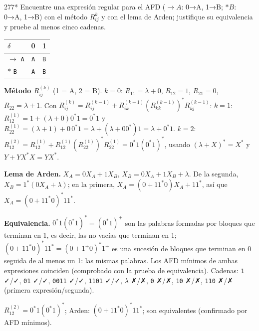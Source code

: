 \documentclass[11pt]{article}
\begin{document}
\begin{ejercicio}{277}{*}
Encuentre una expresión regular para el AFD ($\to A$: 0→A, 1→B; $*B$: 0→A, 1→B) con el método $R_{ij}^{k}$ y con el lema de Arden; justifique su equivalencia y pruebe al menos cinco cadenas.
\end{ejercicio}
\proc \begin{center}\small\begin{tabular}{lcc}\toprule
$\delta$ & 0 & 1 \\\midrule
$\to$ \texttt{A} & \texttt{A} & \texttt{B} \\
$*$ \texttt{B} & \texttt{A} & \texttt{B} \\
\bottomrule\end{tabular}\end{center}
\textbf{Método $R_{ij}^{(k)}$} (1 = A, 2 = B). $k = 0$: $R_{11} = \lambda + 0$, $R_{12} = 1$, $R_{21} = 0$, $R_{22} = \lambda + 1$. Con $R_{ij}^{(k)} = R_{ij}^{(k-1)} + R_{ik}^{(k-1)}(R_{kk}^{(k-1)})^*R_{kj}^{(k-1)}$: $k = 1$: $R_{12}^{(1)} = 1 + (\lambda + 0)0^*1 = 0^*1$ y $R_{22}^{(1)} = (\lambda + 1) + 0\,0^*1 = \lambda + (\lambda + 00^*)1 = \lambda + 0^*1$. $k = 2$: $R_{12}^{(2)} = R_{12}^{(1)} + R_{12}^{(1)}(R_{22}^{(1)})^*R_{22}^{(1)} = 0^*1(0^*1)^*$, usando $(\lambda + X)^* = X^*$ y $Y + YX^*X = YX^*$.\par \textbf{Lema de Arden.} $X_A = 0X_A + 1X_B$, $X_B = 0X_A + 1X_B + \lambda$. De la segunda, $X_B = 1^*(0X_A + \lambda)$; en la primera, $X_A = (0 + 11^*0)X_A + 11^*$, así que $X_A = (0 + 11^*0)^*11^*$.\par \textbf{Equivalencia.} $0^*1(0^*1)^* = (0^*1)^+$ son las palabras formadas por bloques que terminan en 1, es decir, las no vacías que terminan en 1; $(0 + 11^*0)^*11^* = (0 + 1^+0)^*1^+$ es una sucesión de bloques que terminan en 0 seguida de al menos un 1: las mismas palabras. Los AFD mínimos de ambas expresiones coinciden (comprobado con la prueba de equivalencia). Cadenas: \texttt{1} ✓/✓, \texttt{01} ✓/✓, \texttt{0011} ✓/✓, \texttt{1101} ✓/✓, $\lambda$ ✗/✗, \texttt{0} ✗/✗, \texttt{10} ✗/✗, \texttt{110} ✗/✗ (primera expresión/segunda).

\resp $R_{12}^{(2)} = 0^*1(0^*1)^*$; Arden: $(0 + 11^*0)^*11^*$; son equivalentes (confirmado por AFD mínimos).
\end{document}
